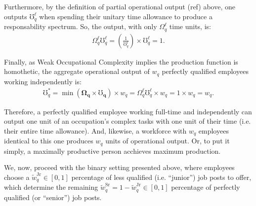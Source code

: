 \documentclass[hidelinks, nonatbib]{elsarticle}
\begin{document}
Furthermore, by the definition of partial operational output (ref) above, one outputs $\mho_{q}^{\ell}$ when spending their unitary time allowance to produce a responsability spectrum. So, the output, with only $\Omega_{q}^{\ell}$ time units, is:
\begin{gather}
    \Omega_{q}^{\ell}
    \mho_{q}^{\ell}
    =
    \left(
        \frac{1}{\mho_{q}^{\ell}}
    \right)
    \times
    \mho_{q}^{\ell}
    =
    1
    .
\end{gather}

Finally, as Weak Occupational Complexity implies the production function is homothetic, the aggregate operational output of $w_q$ perfectly qualified employees working independently is:
\begin{gather}
    \mho_{q}^{*}
    =
    \min(
        \boldsymbol{\Omega_q}
        \times
        \boldsymbol{\mho_q}
    )
    \times
    w_q
    =
    \Omega_{q}^{\ell}
    \mho_{q}^{\ell}
    \times
    w_q
    =
    1
    \times
    w_q
    =
    w_q
    .
\end{gather}

Therefore, a perfectly qualified employee working full-time and independently can output one unit of an occupation's complex tasks with one unit of their time (i.e. their entire time allowance). And, likewise, a workforce with $w_q$ employees identical to this one produces $w_q$ units of operational output. Or, to put it simply, a maximally productive person acchieves maximum production.

We, now, proceed with the binary setting presented above, where employees choose a $\tilde{w}_{q}^{\text{Jr}} \in [0,1]$ percentage of less qualified (i.e. ``junior'') job posts to offer, which determine the remaining $\tilde{w}_{q}^{\text{Sr}} = 1 - \tilde{w}_{q}^{\text{Jr}} \in [0,1]$ percentage of perfectly qualified (or ``senior'') job posts.
\end{document}
